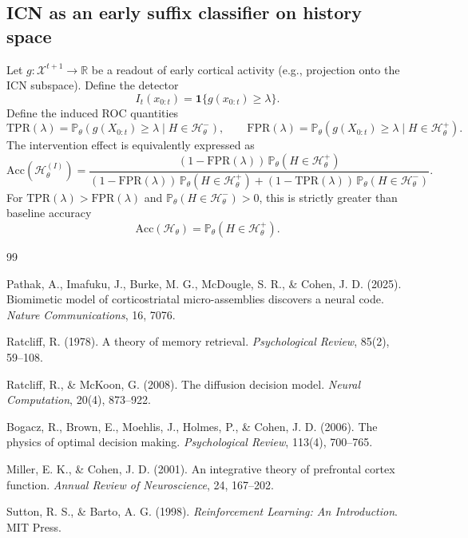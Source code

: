 \documentclass[11pt]{article}
\newcommand{\histories}{\mathcal{H}}
\begin{document}
\subsection{ICN as an early suffix classifier on history space}

Let $g:\mathcal{X}^{t+1}\to\mathbb{R}$ be a readout of early cortical activity (e.g., projection onto the ICN subspace). Define the detector
\[
I_t(x_{0:t}) = \mathbf{1}\{g(x_{0:t})\ge \lambda\}.
\]
Define the induced ROC quantities
\[
\mathrm{TPR}(\lambda)=\mathbb{P}_\theta(g(X_{0:t})\ge\lambda\mid H\in\histories_\theta^{-}),\qquad
\mathrm{FPR}(\lambda)=\mathbb{P}_\theta(g(X_{0:t})\ge\lambda\mid H\in\histories_\theta^{+}).
\]
The intervention effect is equivalently expressed as
\[
\mathrm{Acc}(\histories_\theta^{(I)}) = \frac{(1-\mathrm{FPR}(\lambda))\,\mathbb{P}_\theta(H\in\histories_\theta^{+})}{(1-\mathrm{FPR}(\lambda))\,\mathbb{P}_\theta(H\in\histories_\theta^{+}) + (1-\mathrm{TPR}(\lambda))\,\mathbb{P}_\theta(H\in\histories_\theta^{-})}.
\]
For $\mathrm{TPR}(\lambda)>\mathrm{FPR}(\lambda)$ and $\mathbb{P}_\theta(H\in\histories_\theta^{-})>0$, this is strictly greater than baseline accuracy
\[
\mathrm{Acc}(\histories_\theta)=\mathbb{P}_\theta(H\in\histories_\theta^{+}).
\]


\begin{thebibliography}{99}

Pathak, A., Imafuku, J., Burke, M. G., McDougle, S. R., \& Cohen, J. D. (2025).
Biomimetic model of corticostriatal micro-assemblies discovers a neural code.
\emph{Nature Communications}, 16, 7076.

Ratcliff, R. (1978).
A theory of memory retrieval.
\emph{Psychological Review}, 85(2), 59--108.

Ratcliff, R., \& McKoon, G. (2008).
The diffusion decision model.
\emph{Neural Computation}, 20(4), 873--922.

Bogacz, R., Brown, E., Moehlis, J., Holmes, P., \& Cohen, J. D. (2006).
The physics of optimal decision making.
\emph{Psychological Review}, 113(4), 700--765.

Miller, E. K., \& Cohen, J. D. (2001).
An integrative theory of prefrontal cortex function.
\emph{Annual Review of Neuroscience}, 24, 167--202.

Sutton, R. S., \& Barto, A. G. (1998).
\emph{Reinforcement Learning: An Introduction}.
MIT Press.

\end{thebibliography}
\end{document}
